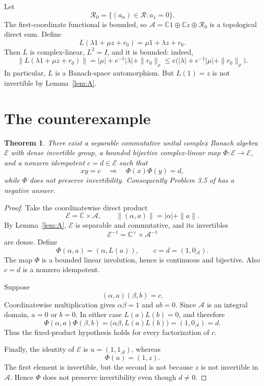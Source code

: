 \documentclass[11pt]{article}
\newtheorem{theorem}{Theorem}
\newcommand{\C}{\mathbb C}
\newcommand{\E}{\mathcal E}
\newcommand{\R}{\mathcal R}
\newcommand{\A}{\mathcal A}
\begin{document}
Let
\[
 \R_0=\{(a_n)\in\R:a_1=0\}.
\]
The first-coordinate functional is bounded, so
$\A=\C1\oplus\C z\oplus\R_0$ is a topological direct sum. Define
\begin{equation}\label{eq:L}
 L(\lambda1+\mu z+r_0)=\mu1+\lambda z+r_0.
\end{equation}
Then $L$ is complex-linear, $L^2=I$, and it is bounded: indeed,
\[
 \|L(\lambda1+\mu z+r_0)\|
 =|\mu|+e^{-1}|\lambda|+\|r_0\|_\rho
 \le e\bigl(|\lambda|+e^{-1}|\mu|+\|r_0\|_\rho\bigr).
\]
In particular, $L$ is a Banach-space automorphism. But $L(1)=z$ is not
invertible by Lemma~\ref{lem:A}.

\section{The counterexample}

\begin{theorem}\label{thm:counterexample}
There exist a separable commutative unital complex Banach algebra $\E$ with
dense invertible group, a bounded bijective complex-linear map
$\Phi:\E\to\E$, and a nonzero idempotent $c=d\in\E$ such that
\[
        xy=c\quad\Longrightarrow\quad\Phi(x)\Phi(y)=d,
\]
while $\Phi$ does not preserve invertibility. Consequently Problem 3.5 of
\cite{Julius2023} has a negative answer.
\end{theorem}

\begin{proof}
Take the coordinatewise direct product
\[
       \E=\C\times\A,
       \qquad \|(\alpha,a)\|=|\alpha|+\|a\|.
\]
By Lemma~\ref{lem:A}, $\E$ is separable and commutative, and its invertibles
\[
       \E^{-1}=\C^{\times}\times\A^{-1}
\]
are dense. Define
\[
       \Phi(\alpha,a)=(\alpha,L(a)),
       \qquad c=d=(1,0_\A).
\]
The map $\Phi$ is a bounded linear involution, hence is continuous and
bijective. Also $c=d$ is a nonzero idempotent.

Suppose
\[
       (\alpha,a)(\beta,b)=c.
\]
Coordinatewise multiplication gives $\alpha\beta=1$ and $ab=0$. Since
$\A$ is an integral domain, $a=0$ or $b=0$. In either case
$L(a)L(b)=0$, and therefore
\[
 \Phi(\alpha,a)\Phi(\beta,b)
 =\bigl(\alpha\beta,L(a)L(b)\bigr)
 =(1,0_\A)=d.
\]
Thus the fixed-product hypothesis holds for every factorization of $c$.

Finally, the identity of $\E$ is $u=(1,1_\A)$, whereas
\[
       \Phi(u)=(1,z).
\]
The first element is invertible, but the second is not because $z$ is not
invertible in $\A$. Hence $\Phi$ does not preserve invertibility even though
$d\ne0$.
\end{proof}
\end{document}
